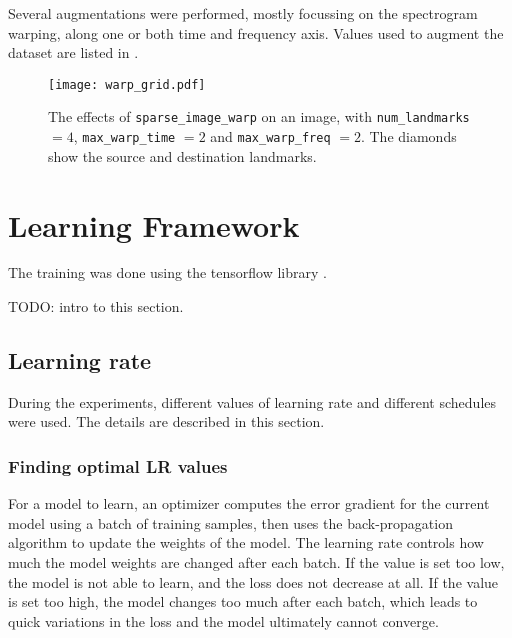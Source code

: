 Several augmentations were performed, mostly focussing on the spectrogram
warping, along one or both time and frequency axis.
Values used to augment the dataset are listed in .

\begin{figure}[t!]
    \centering
    \texttt{[image: warp\_grid.pdf]}
    \caption{
    The effects of \texttt{sparse\_image\_warp} on an image, with
\texttt{num\_landmarks} $=4$, \texttt{max\_warp\_time} $=2$ and
\texttt{max\_warp\_freq} $=2$. The diamonds show the source and destination
landmarks.}%
    \label{fig:warp_grid}
\end{figure}

\section{Learning Framework}
\label{sec:learning_framework}


The training was done using the tensorflow library \cite{tensorflow2015-whitepaper}.

TODO: intro to this section.

\subsection{Learning rate}

During the experiments, different values of learning rate and different
schedules were used.
The details are described in this section.

\subsubsection{Finding optimal LR values}

For a model to learn, an optimizer computes the error gradient for the current
model using a batch of training samples, then uses the back-propagation
algorithm to update the weights of the model.
The learning rate controls how much the model weights are changed after each batch.
If the value is set too low, the model is not able to learn, and the loss does
not decrease at all.
If the value is set too high, the model changes too much after each batch,
which leads to quick variations in the loss and the model ultimately cannot
converge.

